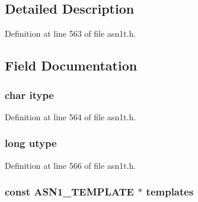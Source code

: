 \subsection{Detailed Description}


Definition at line 563 of file asn1t.\+h.



\subsection{Field Documentation}
\subsubsection[{\texorpdfstring{itype}{itype}}]{\setlength{\rightskip}{0pt plus 5cm}char itype}\hypertarget{struct_a_s_n1___i_t_e_m__st_af4501dc167020ccee24a341f21724862}{}\label{struct_a_s_n1___i_t_e_m__st_af4501dc167020ccee24a341f21724862}


Definition at line 564 of file asn1t.\+h.

\subsubsection[{\texorpdfstring{utype}{utype}}]{\setlength{\rightskip}{0pt plus 5cm}long utype}\hypertarget{struct_a_s_n1___i_t_e_m__st_aacbed54996b0472b3e5933aa1f9aabc0}{}\label{struct_a_s_n1___i_t_e_m__st_aacbed54996b0472b3e5933aa1f9aabc0}


Definition at line 566 of file asn1t.\+h.

\subsubsection[{\texorpdfstring{templates}{templates}}]{\setlength{\rightskip}{0pt plus 5cm}const {\bf A\+S\+N1\+\_\+\+T\+E\+M\+P\+L\+A\+TE} $\ast$ templates}\hypertarget{struct_a_s_n1___i_t_e_m__st_a87113c724127f76609596e13d438d4aa}{}\label{struct_a_s_n1___i_t_e_m__st_a87113c724127f76609596e13d438d4aa}


